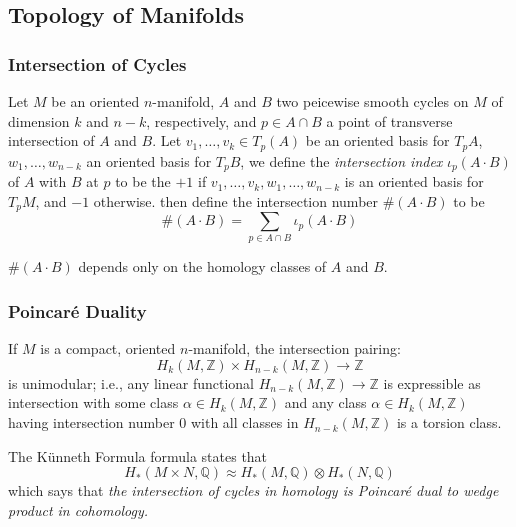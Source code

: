 \subsection{Topology of Manifolds}

\subsubsection{Intersection of Cycles}

\begin{defn}
	Let $M$ be an oriented $n$-manifold, $A$ and $B$ two peicewise smooth cycles on $M$ of dimension $k$ and $n-k$, respectively, and $p \in A \cap B$ a point of transverse intersection of $A$ and $B$. Let $v_1, \ldots, v_k \in T_p (A)$ be an oriented basis for $T_p A$, $w_1, \ldots, w_{n-k}$ an oriented basis for $T_pB$, we define the \textit{intersection index} $\iota_p(A \cdot B)$ of $A$ with $B$ at $p$ to be the $+1$ if $ v_1, \ldots, v_k, w_1, \ldots, w_{n-k}$ is an oriented basis for $T_pM$, and $-1$ otherwise. then define the intersection number $ \#(A \cdot B)$ to be 
\[
	\# \left( A \cdot B \right) = \sum_{p \in A \cap B} \iota_p (A \cdot B)
\]

\end{defn}

\begin{prop}
	$\#(A \cdot B)$ depends only on the homology classes of $A$ and $B$.
\end{prop}

\subsubsection{Poincar\'e Duality}

\begin{thm}
	If $M$ is a compact, oriented $n$-manifold, the intersection pairing:
	\[
		H_k \left( M, \mathbb{Z} \right) \times H_{n-k} \left( M, \mathbb{Z} \right) \to \mathbb{Z}
	\]
	is unimodular; i.e., any linear functional $H_{n-k} \left( M, \mathbb{Z} \right) \to \mathbb{Z}$ is expressible as intersection with some class $\alpha \in H_k \left( M, \mathbb{Z} \right) $ and any class $ \alpha \in H_k \left( M, \mathbb{Z} \right) $ having intersection number 0 with all classes in $H_{n-k} \left( M, \mathbb{Z} \right) $ is a torsion class.
\end{thm}

\begin{prop}
	The K\"unneth Formula formula states that
	\[
		H_* \left( M \times N , \mathbb{Q}\right) \approx H_* \left( M, \mathbb{Q} \right) \otimes H_* \left( N, \mathbb{Q} \right)
	\]
	which says that \textit{the intersection of cycles in homology is Poincar\'e dual to wedge product in cohomology.}
\end{prop}

